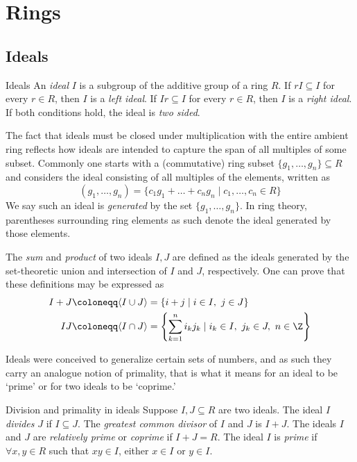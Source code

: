 

\section{Rings}

\subsection{Ideals}

\begin{definition}{Ideals}
    An \emph{ideal} $I$ is a subgroup of the additive group of a ring $R$.
    If $rI\subseteq I$ for every $r\in R$, then $I$ is a \emph{left ideal}.
    If $Ir\subseteq I$ for every $r\in R$, then $I$ is a \emph{right ideal}.
    If both conditions hold, the ideal is \emph{two sided}.
\end{definition}

The fact that ideals must be closed under multiplication with the entire ambient ring reflects how ideals are intended to capture the span of all multiples of some subset.
Commonly one starts with a (commutative) ring subset $\{g_1,\dots,g_n\}\subseteq R$ and considers the ideal consisting of all multiples of the elements, written as
\begin{equation}
    (g_1,\dots,g_n) = \{c_1g_1+\dots+c_ng_n\mid c_1,\dots,c_n\in R\}
\end{equation}
We say such an ideal is \emph{generated} by the set $\{g_1,\dots,g_n\}$.
In ring theory, parentheses surrounding ring elements as such denote the ideal generated by those elements.

The \emph{sum} and \emph{product} of two ideals $I,J$ are defined as the ideals generated by the set-theoretic union and intersection of $I$ and $J$, respectively.
One can prove that these definitions may be expressed as
\begin{align}
    I+J\coloneqq\langle I\cup J\rangle&=\left\{i+j\mid i\in I,\ j\in J\right\}\\
    IJ\coloneqq\langle I\cap J\rangle&=\left\{\sum_{k=1}^n i_kj_k\mid i_k\in I,\ j_k\in J,\ n\in\Z\right\}
\end{align}

Ideals were conceived to generalize certain sets of numbers, and as such they carry an analogue notion of primality, that is what it means for an ideal to be `prime' or for two ideals to be `coprime.'

\begin{definition}{Division and primality in ideals}
    Suppose $I,J\subseteq R$ are two ideals.
    The ideal $I$ \emph{divides} $J$ if $I\subseteq J$.
    The \emph{greatest common divisor} of $I$ and $J$ is $I+J$.
    The ideals $I$ and $J$ are \emph{relatively prime} or \emph{coprime} if $I + J = R$.
    The ideal $I$ is \emph{prime} if $\forall x,y\in R$ such that $xy\in I$, either $x\in I$ or $y\in I$.
\end{definition}

